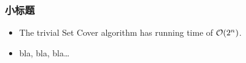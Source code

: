 \begin{frame}\frametitle{小标题}
\begin{itemize}
\pause \item The trivial Set Cover algorithm has running time of ${\cal O}(2^n)$.
\pause \item bla, bla, bla\ldots
\end{itemize}

\end{frame}